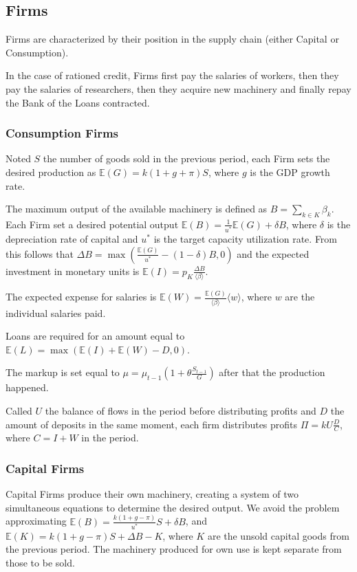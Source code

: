 \documentclass[a4paper, headings=standardclasses]{scrartcl}
\begin{document}
\subsection{Firms}
Firms are characterized by their position in the supply chain (either Capital or Consumption).

In the case of rationed credit, Firms first pay the salaries of workers, then they pay the salaries of researchers, then they acquire new machinery and finally repay the Bank of the Loans contracted.

\subsubsection{Consumption Firms}
Noted $S$ the number of goods sold in the previous period, each Firm sets the desired production as $\mathbb{E}(G) = k(1+g+\pi)S$, where $g$ is the GDP growth rate.

The maximum output of the available machinery is defined as $B = \sum_{k \in K} \beta_k$. Each Firm set a desired potential output $\mathbb{E}(B) = \frac{1}{u^*}\mathbb{E}(G) + \delta B$, where $\delta$ is the depreciation rate of capital and $u^*$ is the target capacity utilization rate. From this follows that $\Delta B = \max(\frac{\mathbb{E}(G)}{u^*} - (1 - \delta) B, 0)$ and the expected investment in monetary units is $\mathbb{E}(I) = p_K\frac{\Delta B}{\langle \beta \rangle}$.

The expected expense for salaries is $\mathbb{E}(W) = \frac{\mathbb{E}(G)}{\langle \beta \rangle}\langle w \rangle$, where $w$ are the individual salaries paid.

Loans are required for an amount equal to $\mathbb{E}(L) = \max(\mathbb{E}(I) + \mathbb{E}(W) - D,0)$.

The markup is set equal to $\mu = \mu_{t-1}(1 + \theta \frac{S_{t-1}}{G})$ after that the production happened.

Called $U$ the balance of flows in the period before distributing profits and $D$ the amount of deposits in the same moment, each firm distributes profits $\Pi = k U \frac{D}{C}$, where $C = I + W$ in the period.


\subsubsection{Capital Firms}
Capital Firms produce their own machinery, creating a system of two simultaneous equations to determine the desired output.
We avoid the problem approximating $\mathbb{E}(B) = \frac{k(1+g-\pi)}{u^*}S + \delta B$, and $\mathbb{E}(K) = k(1+g-\pi)S + \Delta B - K$, where $K$ are the unsold capital goods from the previous period. The machinery produced for own use is kept separate from those to be sold.
\end{document}
